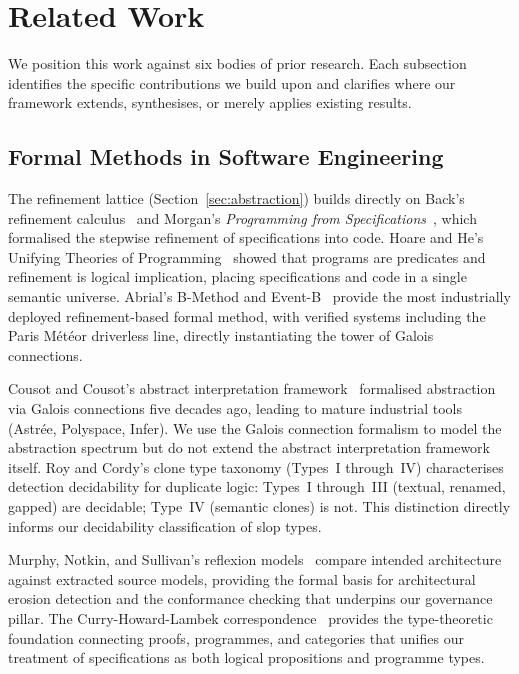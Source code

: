 \documentclass[11pt, a4paper]{googledeepmind}
\begin{document}
\section{Related Work}
\label{sec:related}

We position this work against six bodies of prior research.  Each subsection
identifies the specific contributions we build upon and clarifies where our
framework extends, synthesises, or merely applies existing results.


\subsection{Formal Methods in Software Engineering}

The refinement lattice (Section~\ref{sec:abstraction}) builds directly on Back's
refinement calculus~\citep{back1980correctness} and Morgan's \emph{Programming
from Specifications}~\citep{morgan1994programming}, which formalised the
stepwise refinement of specifications into code.  Hoare and He's Unifying
Theories of Programming~\citep{hoare1998unifying} showed that programs are
predicates and refinement is logical implication, placing specifications and
code in a single semantic universe.  Abrial's B-Method and
Event-B~\citep{abrial2010modeling} provide the most industrially deployed
refinement-based formal method, with verified systems including the Paris
M\'{e}t\'{e}or driverless line, directly instantiating the tower of Galois
connections.

Cousot and Cousot's abstract interpretation
framework~\citep{cousot1977abstract} formalised abstraction via Galois
connections five decades ago, leading to mature industrial tools (Astr\'{e}e,
Polyspace, Infer).  We use the Galois connection formalism to model the
abstraction spectrum but do not extend the abstract interpretation framework
itself.  Roy and Cordy's clone type taxonomy (Types~I through~IV) characterises
detection decidability for duplicate logic: Types~I through~III (textual,
renamed, gapped) are decidable; Type~IV (semantic clones) is not.  This
distinction directly informs our decidability classification of slop types.

Murphy, Notkin, and Sullivan's reflexion models~\citep{murphy1995, murphy2001}
compare intended architecture against extracted source models, providing the
formal basis for architectural erosion detection and the conformance checking
that underpins our governance pillar.  The Curry-Howard-Lambek
correspondence~\citep{wadler2015propositions} provides the type-theoretic
foundation connecting proofs, programmes, and categories that unifies our
treatment of specifications as both logical propositions and programme types.
\end{document}
